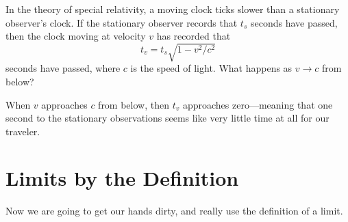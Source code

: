 \begin{exercises}
\begin{exercise}
In the theory of special relativity, a moving clock ticks slower than
a stationary observer's clock. If the stationary observer records that
$t_s$ seconds have passed, then the clock moving at velocity $v$ has
recorded that
\[
t_v = t_s \sqrt{1 - v^2/c^2}
\]
seconds have passed, where $c$ is the speed of light. What happens as $v\to c$ from below?
\begin{answer}
  When $v$ approaches $c$ from below, then $t_v$ approaches zero---meaning that one second to the stationary observations seems like very little time at all for our traveler.
\end{answer}
\end{exercise}


\end{exercises}















\section{Limits by the Definition}


Now we are going to get our hands dirty, and really use the definition
of a limit.

